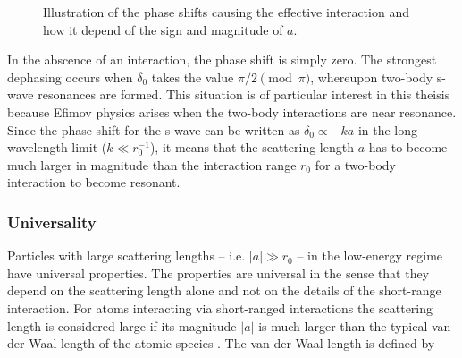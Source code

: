 \documentclass{article}
\providecommand{\abs}[1]{\lvert#1\rvert} \providecommand{\norm}[1]{\lVert#1\rVert}
\numberwithin{equation}{section}
\numberwithin{figure}{section}
\begin{document}
\begin{figure}
	\centering  
	\caption{Illustration of the phase shifts causing the effective interaction and how it depend of the sign and magnitude of $a$.}\label{fig:phaseshift}
\end{figure}
In the abscence of an interaction, the phase shift is simply zero. The strongest dephasing occurs when $\delta_0$ takes the value $\pi/2 \pmod{\pi}$, whereupon two-body s-wave resonances are formed. This situation is of particular interest in this theisis because Efimov physics arises when the two-body interactions are near resonance. Since the phase shift for the s-wave can be written as $\delta_0 \propto -ka$ in the long wavelength limit ($k \ll r_0^{-1}$), it means that the scattering length $a$ has to become much larger in magnitude than the interaction range $r_0$ for a two-body interaction to become resonant.

\subsubsection{Universality}
Particles with large scattering lengths -- i.e. $\abs{a}\gg r_0$ -- in the low-energy regime have universal properties. The properties are universal in the sense that they depend on the scattering length alone and not on the details of the short-range interaction. For atoms interacting via short-ranged interactions the scattering length is considered large if its magnitude $\abs{a}$ is much larger than the typical van der Waal length of the atomic species \cite{2008AnPhy.323.1770B}. The van der Waal length is defined by
\end{document}
